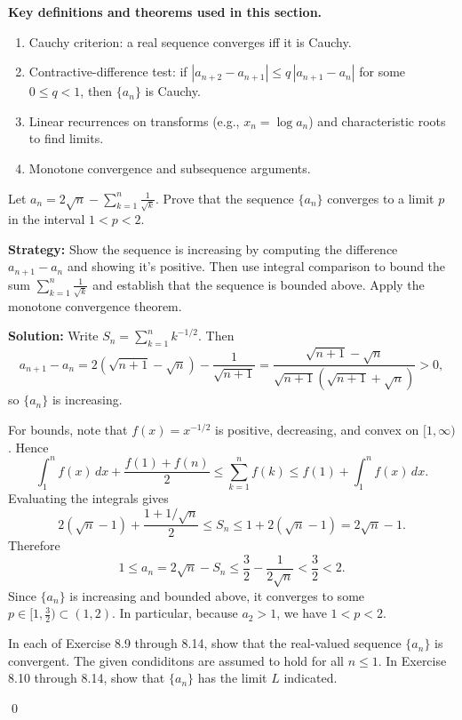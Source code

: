 \noindent\textbf{Key definitions and theorems used in this section.}
\begin{enumerate}
\item Cauchy criterion: a real sequence converges iff it is Cauchy.
\item Contractive-difference test: if \(|a_{n+2}-a_{n+1}|\le q\,|a_{n+1}-a_n|\) for some \(0\le q<1\), then \(\{a_n\}\) is Cauchy.
\item Linear recurrences on transforms (e.g., \(x_n=\log a_n\)) and characteristic roots to find limits.
\item Monotone convergence and subsequence arguments.
\end{enumerate}



\begin{problembox}
\begin{problemstatement}
Let \(a_n = 2\sqrt{n}-\sum_{k=1}^n \frac{1}{\sqrt{k}}\). Prove that the sequence \(\{a_n\}\) converges to a limit \(p\) in the interval \(1 < p < 2\).
\end{problemstatement}
\end{problembox}

\noindent\textbf{Strategy:} Show the sequence is increasing by computing the difference \(a_{n+1}-a_n\) and showing it's positive. Then use integral comparison to bound the sum \(\sum_{k=1}^n \frac{1}{\sqrt{k}}\) and establish that the sequence is bounded above. Apply the monotone convergence theorem.

\bigskip\noindent\textbf{Solution:}
Write \(S_n=\sum_{k=1}^n k^{-1/2}\). Then
\[a_{n+1}-a_n = 2(\sqrt{n+1}-\sqrt{n})-\frac{1}{\sqrt{n+1}} = \frac{\sqrt{n+1}-\sqrt{n}}{\sqrt{n+1}(\sqrt{n+1}+\sqrt{n})} > 0,\]
so \(\{a_n\}\) is increasing.

For bounds, note that \(f(x)=x^{-1/2}\) is positive, decreasing, and convex on \([1,\infty)\). Hence
\[\int_{1}^{n} f(x)\,dx + \frac{f(1)+f(n)}{2} \le \sum_{k=1}^{n} f(k) \le f(1)+\int_{1}^{n} f(x)\,dx.\]
Evaluating the integrals gives
\[2(\sqrt{n}-1)+\frac{1+1/\sqrt{n}}{2} \le S_n \le 1+2(\sqrt{n}-1)=2\sqrt{n}-1.\]
Therefore
\[1 \le a_n = 2\sqrt{n}-S_n \le \frac{3}{2}-\frac{1}{2\sqrt{n}} < \frac{3}{2} < 2.\]
Since \(\{a_n\}\) is increasing and bounded above, it converges to some \(p\in[1,\tfrac{3}{2})\subset(1,2)\). In particular, because \(a_2>1\), we have \(1<p<2\).



\begin{tcolorbox}[colback=red!10,colframe=red!50,arc=3pt,boxrule=1pt]
In each of Exercise 8.9 through 8.14, show that the real-valued sequence $\{a_n\}$ is convergent. The given condiditons are assumed to hold for all $n\leq 1$. In Exercise 8.10 through 8.14, show that $\{a_n\}$ has the limit $L$ indicated.
\end{tcolorbox}\qed


